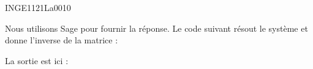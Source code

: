 

\begin{corrige}{INGE1121La0010}

	Nous utilisons Sage pour fournir la réponse. Le code suivant résout le système et donne l'inverse de la matrice :


La sortie est ici :


\end{corrige}
